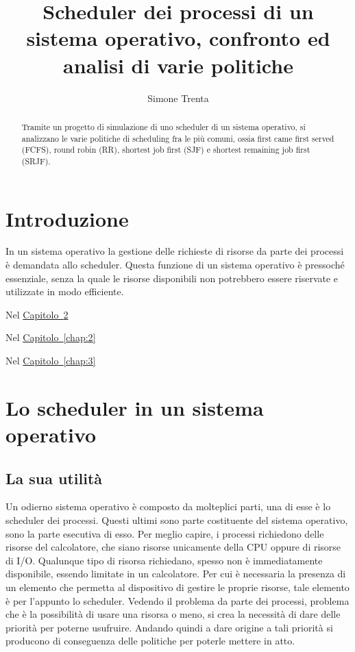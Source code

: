 \documentclass[Lau, oneside]{sapthesis}%
\title{Scheduler dei processi di un sistema operativo, confronto ed analisi di varie politiche}
\author{Simone Trenta}
\begin{document}
\frontmatter
\maketitle

\begin{abstract}
Tramite un progetto di simulazione di uno scheduler di un sistema operativo, si analizzano le varie politiche di scheduling fra le più comuni, ossia first came first served (FCFS), round robin (RR), shortest job first (SJF) e shortest remaining job first (SRJF).
\end{abstract}

\tableofcontents

\mainmatter
\chapter{Introduzione}
\lettrine[lines=2, findent=3pt, nindent=0pt]{I}{}n un sistema operativo la gestione delle richieste di risorse da parte dei processi è demandata allo scheduler.
Questa funzione di un sistema operativo è pressoché essenziale, senza la quale le risorse disponibili non potrebbero essere riservate e utilizzate in modo efficiente.

\bigskip
Nel \hyperref[chap:1]{Capitolo~\ref*{chap:1}}

\bigskip
Nel \hyperref[chap:2]{Capitolo~\ref*{chap:2}} 

\bigskip
Nel \hyperref[chap:3]{Capitolo~\ref*{chap:3}} 

\chapter{Lo scheduler in un sistema operativo}
\label{chap:1} 
\section{La sua utilità}
\label{sec:utilita}
Un odierno sistema operativo è composto da molteplici parti, una di esse è lo scheduler dei processi.
Questi ultimi sono parte costituente del sistema operativo, sono la parte esecutiva di esso.
Per meglio capire, i processi richiedono delle risorse del calcolatore, che siano risorse unicamente della CPU oppure di risorse di I/O.
Qualunque tipo di risorsa richiedano, spesso non è immediatamente disponibile, essendo limitate in un calcolatore.
Per cui è necessaria la presenza di un elemento che permetta al dispositivo di gestire le proprie risorse, tale elemento è per l'appunto lo scheduler.
Vedendo il problema da parte dei processi, problema che è la possibilità di usare una risorsa o meno, si crea la necessità di dare delle priorità per poterne usufruire.
Andando quindi a dare origine a tali priorità si producono di conseguenza delle politiche per poterle mettere in atto.
\end{document}
